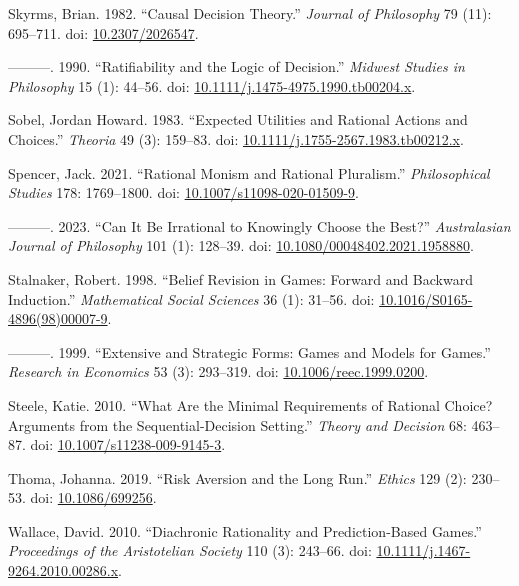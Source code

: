 \documentclass[
  11pt,
  letterpaper,
  DIV=11,
  numbers=noendperiod,
  twoside]{scrartcl}
\newlength{\cslhangindent}
\newenvironment{CSLReferences}[2] %
 {\begin{list}{}{%
  \setlength{\itemindent}{0pt}
  \setlength{\leftmargin}{0pt}
  \setlength{\parsep}{0pt}
  \ifodd #1
   \setlength{\leftmargin}{\cslhangindent}
   \setlength{\itemindent}{-1\cslhangindent}
  \fi
  \setlength{\itemsep}{#2\baselineskip}}}
 {\end{list}}
\begin{document}
\begin{CSLReferences}{1}{0}
Skyrms, Brian. 1982. {``Causal Decision Theory.''} \emph{Journal of
Philosophy} 79 (11): 695--711. doi:
\href{https://doi.org/10.2307/2026547}{10.2307/2026547}.

---------. 1990. {``Ratifiability and the Logic of Decision.''}
\emph{Midwest Studies in Philosophy} 15 (1): 44--56. doi:
\href{https://doi.org/10.1111/j.1475-4975.1990.tb00204.x}{10.1111/j.1475-4975.1990.tb00204.x}.

Sobel, Jordan Howard. 1983. {``Expected Utilities and Rational Actions
and Choices.''} \emph{Theoria} 49 (3): 159--83. doi:
\href{https://doi.org/10.1111/j.1755-2567.1983.tb00212.x}{10.1111/j.1755-2567.1983.tb00212.x}.

Spencer, Jack. 2021. {``Rational Monism and Rational Pluralism.''}
\emph{Philosophical Studies} 178: 1769--1800. doi:
\href{https://doi.org/10.1007/s11098-020-01509-9}{10.1007/s11098-020-01509-9}.

---------. 2023. {``Can It Be Irrational to Knowingly Choose the
Best?''} \emph{Australasian Journal of Philosophy} 101 (1): 128--39.
doi:
\href{https://doi.org/10.1080/00048402.2021.1958880}{10.1080/00048402.2021.1958880}.

Stalnaker, Robert. 1998. {``Belief Revision in Games: Forward and
Backward Induction.''} \emph{Mathematical Social Sciences} 36 (1):
31--56. doi:
\href{https://doi.org/10.1016/S0165-4896(98)00007-9}{10.1016/S0165-4896(98)00007-9}.

---------. 1999. {``Extensive and Strategic Forms: Games and Models for
Games.''} \emph{Research in Economics} 53 (3): 293--319. doi:
\href{https://doi.org/10.1006/reec.1999.0200}{10.1006/reec.1999.0200}.

Steele, Katie. 2010. {``What Are the Minimal Requirements of Rational
Choice? Arguments from the Sequential-Decision Setting.''} \emph{Theory
and Decision} 68: 463--87. doi:
\href{https://doi.org/10.1007/s11238-009-9145-3}{10.1007/s11238-009-9145-3}.

Thoma, Johanna. 2019. {``Risk Aversion and the Long Run.''}
\emph{Ethics} 129 (2): 230--53. doi:
\href{https://doi.org/10.1086/699256}{10.1086/699256}.

Wallace, David. 2010. {``Diachronic Rationality and Prediction-Based
Games.''} \emph{Proceedings of the Aristotelian Society} 110 (3):
243--66. doi:
\href{https://doi.org/10.1111/j.1467-9264.2010.00286.x}{10.1111/j.1467-9264.2010.00286.x}.


\end{CSLReferences}
\end{document}
